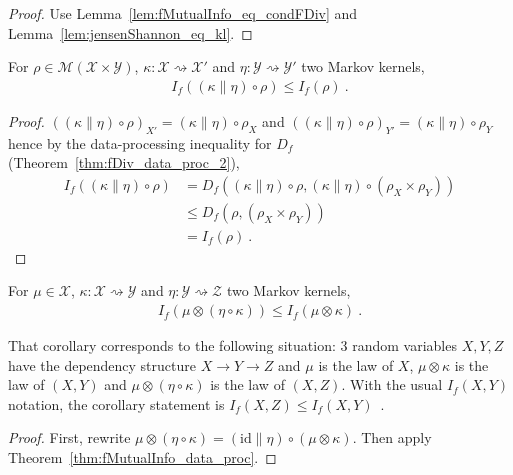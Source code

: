 \begin{proof}%
{}
Use Lemma~\ref{lem:fMutualInfo_eq_condFDiv} and Lemma~\ref{lem:jensenShannon_eq_kl}.
\end{proof}


\begin{theorem}
  \label{thm:fMutualInfo_data_proc}
  For $\rho \in \mathcal M(\mathcal X \times \mathcal Y)$, $\kappa : \mathcal X \rightsquigarrow \mathcal X'$ and $\eta : \mathcal Y \rightsquigarrow \mathcal Y'$ two Markov kernels,
  \begin{align*}
  I_f((\kappa \parallel \eta) \circ \rho) \le I_f(\rho) \: .
  \end{align*}
\end{theorem}

\begin{proof}%
{}
$((\kappa \parallel \eta) \circ \rho)_{X'} = (\kappa \parallel \eta) \circ \rho_X$ and $((\kappa \parallel \eta) \circ \rho)_{Y'} = (\kappa \parallel \eta) \circ \rho_Y$ hence by the data-processing inequality for $D_f$ (Theorem~\ref{thm:fDiv_data_proc_2}),
\begin{align*}
I_f((\kappa \parallel \eta) \circ \rho)
&= D_f((\kappa \parallel \eta) \circ \rho, (\kappa \parallel \eta) \circ (\rho_X \times \rho_Y))
\\
&\le D_f(\rho, (\rho_X \times \rho_Y))
\\
&= I_f(\rho)
\: .
\end{align*}
\end{proof}

\begin{corollary}
  \label{cor:fMutualInfo_compProd_le}
  For $\mu \in \mathcal X$, $\kappa : \mathcal X \rightsquigarrow \mathcal Y$ and $\eta : \mathcal Y \rightsquigarrow \mathcal Z$ two Markov kernels,
  \begin{align*}
  I_f(\mu \otimes (\eta \circ \kappa)) \le I_f(\mu \otimes \kappa)
  \: .
  \end{align*}
\end{corollary}

That corollary corresponds to the following situation: 3 random variables $X, Y, Z$ have the dependency structure $X \to Y \to Z$ and $\mu$ is the law of $X$, $\mu \otimes \kappa$ is the law of $(X, Y)$ and $\mu \otimes (\eta \circ \kappa)$ is the law of $(X, Z)$.
With the usual $I_f(X, Y)$ notation, the corollary statement is $I_f(X, Z) \le I_f(X, Y)$~.

\begin{proof}%
{}
First, rewrite $\mu \otimes (\eta \circ \kappa) = (\mathrm{id} \parallel \eta) \circ (\mu \otimes \kappa)$. Then apply Theorem~\ref{thm:fMutualInfo_data_proc}.
\end{proof}
